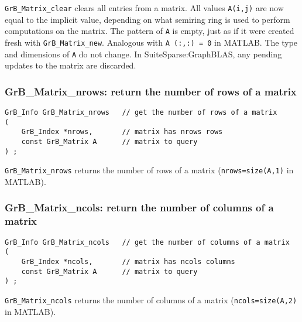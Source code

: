 \documentclass[12pt]{article}
\begin{document}
\verb'GrB_Matrix_clear' clears all entries from a matrix.  All values
\verb'A(i,j)' are now equal to the implicit value, depending on what semiring
ring is used to perform computations on the matrix.  The pattern of \verb'A' is
empty, just as if it were created fresh with \verb'GrB_Matrix_new'.  Analogous
with \verb'A (:,:) = 0' in MATLAB.  The type and dimensions of \verb'A' do not
change.  In SuiteSparse:Graph\-BLAS, any pending updates to the matrix are
discarded.

\subsubsection{{\sf GrB\_Matrix\_nrows:}        return the number of rows of a matrix}
\label{matrix_nrows}

\begin{mdframed}[userdefinedwidth=6in]
{\footnotesize
\begin{verbatim}
GrB_Info GrB_Matrix_nrows   // get the number of rows of a matrix
(
    GrB_Index *nrows,       // matrix has nrows rows
    const GrB_Matrix A      // matrix to query
) ;
\end{verbatim} } \end{mdframed}

\verb'GrB_Matrix_nrows' returns the number of rows of a matrix
(\verb'nrows=size(A,1)' in MATLAB).

\subsubsection{{\sf GrB\_Matrix\_ncols:}        return the number of columns of a matrix}
\label{matrix_ncols}

\begin{mdframed}[userdefinedwidth=6in]
{\footnotesize
\begin{verbatim}
GrB_Info GrB_Matrix_ncols   // get the number of columns of a matrix
(
    GrB_Index *ncols,       // matrix has ncols columns
    const GrB_Matrix A      // matrix to query
) ;
\end{verbatim}
} \end{mdframed}

\verb'GrB_Matrix_ncols' returns the number of columns of a matrix
(\verb'ncols=size(A,2)' in MATLAB).
\end{document}
